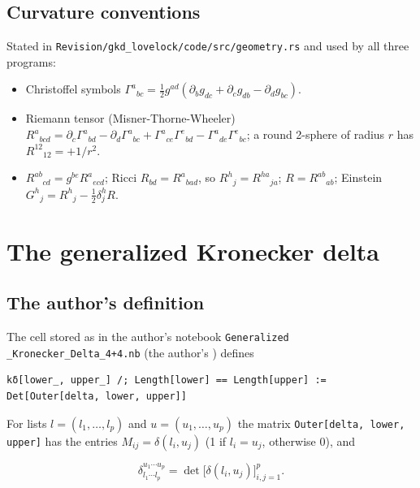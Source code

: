 \documentclass[11pt]{article}
\begin{document}
\subsection{Curvature conventions}

Stated in \texttt{Revision\allowbreak{}/gkd\_lov\allowbreak{}elock/co\allowbreak{}de/src/g\allowbreak{}eometry.\allowbreak{}rs} and used by all three programs:

\begin{itemize}
\item Christoffel symbols $\Gamma^a{}_{bc} = \frac12 g^{ad}(\partial_b g_{dc} + \partial_c g_{db} - \partial_d g_{bc})$.
\item Riemann tensor (Misner-Thorne-Wheeler) $R^a{}_{bcd} = \partial_c\Gamma^a{}_{bd} - \partial_d\Gamma^a{}_{bc} + \Gamma^a{}_{ce}\Gamma^e{}_{bd} - \Gamma^a{}_{de}\Gamma^e{}_{bc}$; a round 2-sphere of radius $r$ has $R^{12}{}_{12} = +1/r^2$.
\item $R^{ab}{}_{cd} = g^{be}R^a{}_{ecd}$; Ricci $R_{bd} = R^a{}_{bad}$, so $R^h{}_j = R^{ha}{}_{ja}$; $R = R^{ab}{}_{ab}$; Einstein $G^h{}_j = R^h{}_j - \frac12\delta^h_jR$.
\end{itemize}

\section{The generalized Kronecker delta}

\subsection{The author's definition}

The cell stored as \texttt{} in the author's notebook \texttt{Generali\allowbreak{}zed \_Kro\allowbreak{}necker\_D\allowbreak{}elta\_4+4\allowbreak{}.nb} (the author's \texttt{}) defines

\begin{Verbatim}[fontsize=\small]
kδ[lower_, upper_] /; Length[lower] == Length[upper] := Det[Outer[delta, lower, upper]]
\end{Verbatim}

For lists $l = (l_1, \dots, l_p)$ and $u = (u_1, \dots, u_p)$ the matrix \texttt{Outer[de\allowbreak{}lta, low\allowbreak{}er, uppe\allowbreak{}r]} has the entries $M_{ij} = \delta(l_i, u_j)$ (1 if $l_i = u_j$, otherwise 0), and

\[
\delta^{u_1\cdots u_p}_{l_1\cdots l_p} = \det\big[\delta(l_i, u_j)\big]_{i,j=1}^{p} .
\]
\end{document}
